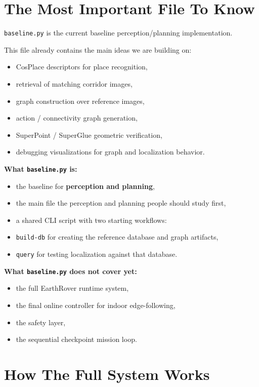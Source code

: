 \documentclass[11pt,a4paper]{article}
\begin{document}
\section{The Most Important File To Know}

\texttt{baseline.py} is the current baseline perception/planning implementation.

This file already contains the main ideas we are building on:

\begin{itemize}[nosep]
  \item CosPlace descriptors for place recognition,
  \item retrieval of matching corridor images,
  \item graph construction over reference images,
  \item action / connectivity graph generation,
  \item SuperPoint / SuperGlue geometric verification,
  \item debugging visualizations for graph and localization behavior.
\end{itemize}

\textbf{What \texttt{baseline.py} is:}

\begin{itemize}[nosep]
  \item the baseline for \textbf{perception and planning},
  \item the main file the perception and planning people should study first,
  \item a shared CLI script with two starting workflows:
  \item \texttt{build-db} for creating the reference database and graph artifacts,
  \item \texttt{query} for testing localization against that database.
\end{itemize}

\textbf{What \texttt{baseline.py} does not cover yet:}

\begin{itemize}[nosep]
  \item the full EarthRover runtime system,
  \item the final online controller for indoor edge-following,
  \item the safety layer,
  \item the sequential checkpoint mission loop.
\end{itemize}


\section{How The Full System Works}
\end{document}
